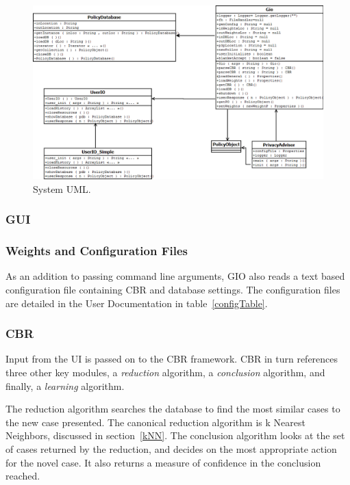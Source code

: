 \begin{figure}[htbp]
\begin{center}
\includegraphics[width = \textwidth]{DesignReport/uml/gio.png}
\caption{System UML.}
\label{working of system} %
\end{center}
\end{figure}

\subsubsection{GUI} %

\subsubsection{Weights and Configuration Files}
As an addition to passing command line arguments, GIO also reads a text based configuration file containing CBR and database settings. The configuration files are detailed in the User Documentation in table~\ref{configTable}. 

\subsubsection{CBR}
Input from the UI is passed on to the CBR framework. CBR in turn references three other key modules, a \emph{reduction} algorithm, a \emph{conclusion} algorithm, and finally, a \emph{learning} algorithm.

The reduction algorithm searches the database to find the most similar cases to the new case presented. The canonical reduction algorithm is k Nearest Neighbors, discussed in section~\ref{kNN}. The conclusion algorithm looks at the set of cases returned by the reduction, and decides on the most appropriate action for the novel case. It also returns a measure of confidence in the conclusion reached.

